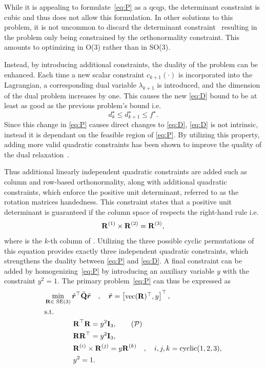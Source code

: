 While it is appealing to formulate~\ref{eq:P} as a \gls{qcqp}, the determinant constraint is cubic and thus does not allow this formulation. In other solutions to this problem, it is not uncommon to discard the determinant constraint~\cite{lagrangian-duality-in-3d-slam:-verification-techniques-and-optimal-solutions,planar-pose-graph-optimization:-duality-optimal-solutions-and-verification} resulting in the problem only being constrained by the orthonormality constraint. This amounts to optimizing in O(3) rather than in SO(3). \medskip

Instead, by introducing additional constraints, the duality of the problem can be enhanced. Each time a new scalar constraint $c_{k+1}(\cdot)$ is incorporated into the Lagrangian, a corresponding dual variable $\lambda_{k+1}$ is introduced, and the dimension of the dual problem increases by one. This causes the new \ref{eq:D} bound  to be at least as good as the previous problem's bound i.e.
%
\begin{equation}
	d^\star_{k} \le d^\star_{k+1} \le f^\star.
\end{equation}
Since this change in \ref{eq:P} causes direct changes to \ref{eq:D}, \ref{eq:D} is not intrinsic, instead it is dependant on the feasible region of \ref{eq:P}. By utilizing this property, adding more valid quadratic constraints has been shown to improve the quality of the dual relaxation~\cite[Chapter 13]{semidefinite-programming-relaxations-of-nonconvex-quadratic-optimization}. \medskip

Thus additional linearly independent quadratic constraints are added such as column and row-based orthonormality, along with additional quadratic constraints, which enforce the positive unit determinant, referred to as the rotation matrices handedness. This constraint states that a positive unit determinant is guaranteed if the column space of  respects the right-hand rule i.e.
%
\begin{equation}
	\bm{\mathrm{R}}^{(1)}\times \bm{\mathrm{R}}^{(2)} = \bm{\mathrm{R}}^{(3)},
\end{equation}
where  is the $k$-th column of . Utilizing the three possible cyclic permutations of this equation provides exactly three independent quadratic constraints, which strengthens the duality between \ref{eq:P} and \ref{eq:D}. A final constraint can be added by homogenizing~\ref{eq:P} by introducing an auxiliary variable $y$ with the constraint $y^2 = 1$. The primary problem~\ref*{eq:P} can thus be expressed as
%
\begin{align*}
	&\min_{\mat{R}\in \SE (3)} \tilde{\vec{r}}^\T \tilde{\mat{Q}} \tilde{\vec{r}}  \quad , \quad \tilde{\vec{r}}=\rvec{\text{vec}(\mat{R})^\T, y}^\T, \\
	& \text{s.t. }         \\ 
	&\qquad \qquad \mat{R}^\T\mat{R} = y^2\mat{I}_3, \tag{$\mathcal{P}$} \label{eq:P}\\
	&\qquad \qquad \mat{R}\mat{R}^\T = y^2 \mat{I}_3, \\
	&\qquad \qquad \mat{R}^{(i)}\times \mat{R}^{(j)}=y \mat{R}^{(k)} \quad , \quad i,j,k = \text{cyclic}(1,2,3), \\
	&\qquad \qquad y^2 = 1.
\end{align*}

